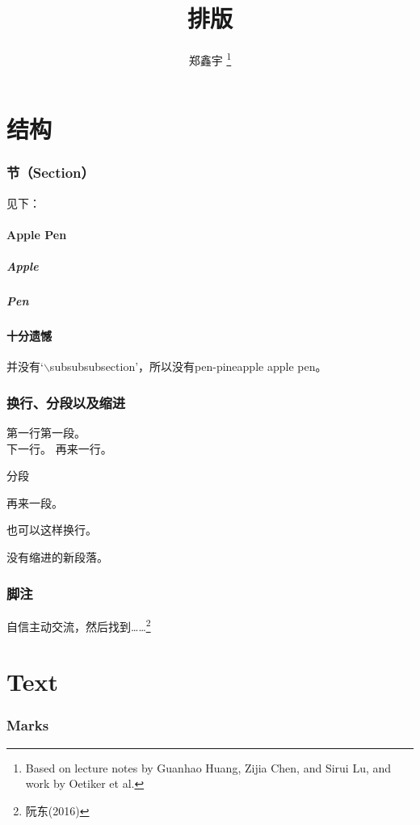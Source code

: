 \documentclass[12pt]{article}
\author{郑鑫宇 \thanks{Based on lecture notes by Guanhao Huang, Zijia Chen, and Sirui Lu, and work by Oetiker et{} al.}}
\title{排版}
\begin{document}
\maketitle
\newpage

\tableofcontents
\newpage

\part{结构}

\section{节（Section）}
见下：
\subsection{Apple Pen}
\subsubsection{Apple}
\subsubsection{Pen}
\subsection*{十分遗憾}
并没有`$\backslash$subsubsubsection'，所以没有pen-pineapple apple pen。

\section{换行、分段以及缩进}
第一行第一段。\\
下一行。\newline
\indent 再来一行。

分段\par
再来一段。

也可以这样换行。

\noindent 没有缩进的新段落。

\section{脚注}
自信主动交流，然后找到……\footnote{阮东(2016)}

\part{Text}
\section{Marks}\label{sec1}
\end{document}
